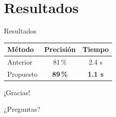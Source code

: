 \documentclass[aspectratio=169]{beamer}
\begin{document}
\section{Resultados}
\begin{frame}{Resultados}
  \centering
  \begin{tabular}{lcc}
    \toprule
    Método & Precisión & Tiempo \\
    \midrule
    Anterior & 81\,\% & 2.4 s \\
    Propuesto & \textbf{89\,\%} & \textbf{1.1 s} \\
    \bottomrule
  \end{tabular}
\end{frame}

\begin{frame}
  \centering
  {\Huge ¡Gracias!}\par
  \vspace{1em}
  ¿Preguntas?
\end{frame}
\end{document}
